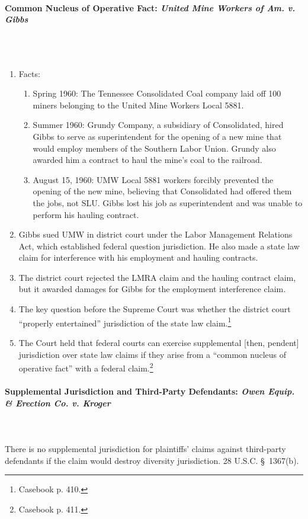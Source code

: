 \paragraph{Common Nucleus of Operative Fact: \emph{United Mine Workers of 
Am. v. Gibbs}} %
~\\\\
\begin{enumerate}
    \item Facts:
    \begin{enumerate}
        \item Spring 1960: The Tennessee Consolidated Coal company laid off 
        100 miners belonging to the United Mine Workers Local 5881.
        \item Summer 1960: Grundy Company, a subsidiary of Consolidated, hired 
        Gibbs to serve as superintendent for the opening of a new mine that 
        would employ members of the Southern Labor Union. Grundy also awarded 
        him a contract to haul the mine's coal to the railroad.
        \item August 15, 1960: UMW Local 5881 workers forcibly prevented the 
        opening of the new mine, believing that Consolidated had offered them 
        the jobs, not SLU. Gibbs lost his job as superintendent and was unable 
        to perform his hauling contract.
    \end{enumerate}
    \item Gibbs sued UMW in district court under the Labor Management 
    Relations Act, which established federal question jurisdiction. He also 
    made a state law claim for interference with his employment and hauling 
    contracts.
    \item The district court rejected the LMRA claim and the hauling contract 
    claim, but it awarded damages for Gibbs for the employment interference 
    claim.
    \item The key question before the Supreme Court was whether the district 
    court ``properly entertained'' jurisdiction of the state law 
    claim.\footnote{Casebook p. 410.}
    \item The Court held that federal courts can exercise supplemental [then, 
    pendent] jurisdiction over state law claims if they arise from a ``common 
    nucleus of operative fact'' with a federal claim.\footnote{Casebook p.  
    411.}
\end{enumerate}

\paragraph{Supplemental Jurisdiction and Third-Party Defendants: \emph{Owen 
Equip. \& Erection Co. v. Kroger}}
~\\\\
There is no supplemental jurisdiction for plaintiffs' claims against 
third-party defendants if the claim would destroy diversity jurisdiction. 28 
U.S.C. \S\ 1367(b).

